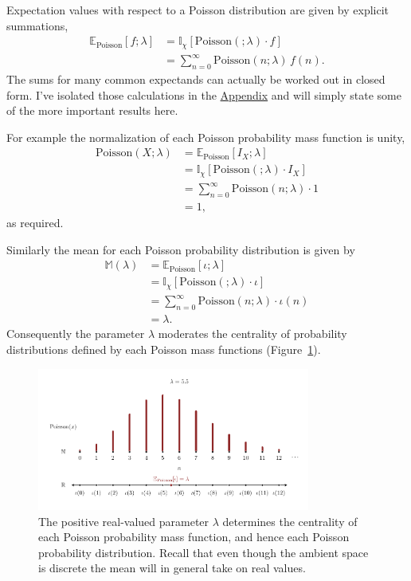 \documentclass[
  letterpaper,
  DIV=11,
  numbers=noendperiod]{scrartcl}
\begin{document}
Expectation values with respect to a Poisson distribution are given by
explicit summations, \begin{align*}
\mathbb{E}_{\mathrm{Poisson}}[ f ; \lambda ]
&=
\mathbb{I}_{\chi}[ \mathrm{Poisson}( ; \lambda) \cdot f ]
\\
&=
\sum_{n = 0}^{\infty} \mathrm{Poisson}(n; \lambda) \, f(n).
\end{align*} The sums for many common expectands can actually be worked
out in closed form. I've isolated those calculations in the
\href{@sec:appendix}{Appendix} and will simply state some of the more
important results here.

For example the normalization of each Poisson probability mass function
is unity, \begin{align*}
\mathrm{Poisson}(X; \lambda)
&= \mathbb{E}_{\mathrm{Poisson}}[ I_{X}; \lambda ]
\\
&= \mathbb{I}_{\chi}[ \mathrm{Poisson}( ; \lambda) \cdot I_{X} ]
\\
&= \sum_{n = 0}^{\infty} \mathrm{Poisson}(n; \lambda) \cdot 1
\\
&= 1,
\end{align*} as required.

Similarly the mean for each Poisson probability distribution is given by
\begin{align*}
\mathbb{M}(\lambda)
&=
\mathbb{E}_{\mathrm{Poisson}} [ \iota ; \lambda ]
\\
&=
\mathbb{I}_{\chi} [ \mathrm{Poisson}( ; \lambda) \cdot \iota ]
\\
&= \sum_{n = 0}^{\infty} \mathrm{Poisson}(n; \lambda) \cdot \iota(n)
\\
&= \lambda.
\end{align*} Consequently the parameter \(\lambda\) moderates the
centrality of probability distributions defined by each Poisson mass
functions (Figure~\ref{fig-poisson-mean}).

\begin{figure}

{\centering \includegraphics[width=0.8\textwidth,height=\textheight]{figures/poisson/mean/mean.pdf}

}

\caption{\label{fig-poisson-mean}The positive real-valued parameter
\(\lambda\) determines the centrality of each Poisson probability mass
function, and hence each Poisson probability distribution. Recall that
even though the ambient space is discrete the mean will in general take
on real values.}

\end{figure}
\end{document}
